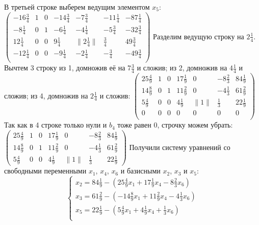 \documentclass[a4paper,14pt]{extarticle}
\begin{document}
В третьей строке выберем ведущим элементом $x_5$:\bigbreak
$\begin{pmatrix}
        -16\frac{3}{4} & 1 & 0 & -14\frac{3}{4} & -7\frac{3}{4}    & -11\frac{1}{4} & -87\frac{1}{4} \\
        -8\frac{1}{4}  & 0 & 1 & -6\frac{1}{4}  & -4\frac{1}{4}    & -5\frac{3}{4}  & -32\frac{3}{4} \\
        12\frac{1}{4}  & 0 & 0 & 9\frac{1}{4}   & \|2\frac{1}{4}\| & \frac{3}{4}    & 49\frac{3}{4}  \\
        -12\frac{1}{4} & 0 & 0 & -9\frac{1}{4}  & -2\frac{1}{4}    & -\frac{3}{4}   & -49\frac{3}{4} \\
    \end{pmatrix}$\bigbreak
Разделим ведущую строку на $2\frac{1}{4}$. Вычтем 3 строку из 1, домножив её на $7\frac{3}{4}$ и сложив; из 2, домножив на $4\frac{1}{4}$ и сложив; из 4, домножив на $2\frac{1}{4}$ и сложив:\bigbreak
$\begin{pmatrix}
        25\frac{4}{9} & 1 & 0 & 17\frac{1}{9} & 0     & -8\frac{2}{3} & 84\frac{1}{9} \\
        14\frac{8}{9} & 0 & 1 & 11\frac{2}{9} & 0     & -4\frac{1}{3} & 61\frac{2}{9} \\
        5\frac{4}{9}  & 0 & 0 & 4\frac{1}{9}  & \|1\| & \frac{1}{3}   & 22\frac{1}{9} \\
        0             & 0 & 0 & 0             & 0     & 0             & 0             \\
    \end{pmatrix}$\bigbreak
Так как в 4 строке только нули и $b_4$ тоже равен 0, строчку можем убрать:\bigbreak
$\begin{pmatrix}
        25\frac{4}{9} & 1 & 0 & 17\frac{1}{9} & 0     & -8\frac{2}{3} & 84\frac{1}{9} \\
        14\frac{8}{9} & 0 & 1 & 11\frac{2}{9} & 0     & -4\frac{1}{3} & 61\frac{2}{9} \\
        5\frac{4}{9}  & 0 & 0 & 4\frac{1}{9}  & \|1\| & \frac{1}{3}   & 22\frac{1}{9}
    \end{pmatrix}$\bigbreak
Получили систему уравнений со свободными переменными $x_1$, $x_4$, $x_6$ и базисными $x_2$, $x_3$ и $x_5$:\bigbreak
\begin{equation*}
    \begin{cases}
        x_2 = 84\frac{1}{9} - (25\frac{4}{9}x_1 + 17\frac{1}{9}x_4 - 8\frac{2}{3}x_6) \\
        x_3 = 61\frac{2}{9} - (-14\frac{8}{9}x_1 + 11\frac{2}{9}x_4 -4\frac{1}{3}x_6) \\
        x_5 = 22\frac{1}{9} - (5\frac{4}{9}x_1 + 4\frac{1}{9}x_4 + \frac{1}{3}x_6)    \\
    \end{cases}
\end{equation*}\\
\end{document}
